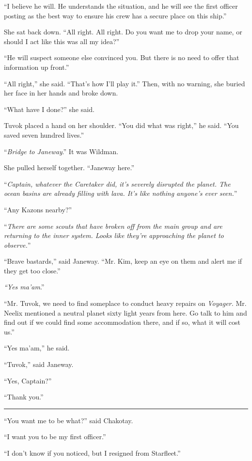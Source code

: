 \documentclass[twoside,letterpaper,12pt]{memoir}
\begin{document}
``I believe he will. He understands the situation, and he will see the first officer posting as the best way to ensure his crew has a secure place on this ship.'' 

She sat back down. ``All right. All right. Do you want me to drop your name, or should I act like this was all my idea?'' 

``He will suspect someone else convinced you. But there is no need to offer that information up front.''

``All right,'' she said. ``That's how I'll play it.'' Then, with no warning, she buried her face in her hands and broke down.

``What have I done?'' she said.

Tuvok placed a hand on her shoulder. ``You did what was right,'' he said. ``You saved seven hundred lives.''

``\textit{Bridge to Janeway}.'' It was Wildman. 

She pulled herself together. ``Janeway here.'' 

``\textit{Captain, whatever the Caretaker did, it’s severely disrupted the planet. The ocean basins are already filling with lava. It’s like nothing anyone’s ever seen.}'' 

``Any Kazons nearby?'' 

``\textit{There are some scouts that have broken off from the main group and are returning to the inner system. Looks like they’re approaching the planet to observe.}'' 

``Brave bastards,'' said Janeway. ``Mr. Kim, keep an eye on them and alert me if they get too close.'' 

\textit{``Yes ma’am}.'' 

``Mr. Tuvok, we need to find someplace to conduct heavy repairs on \textit{Voyager. }Mr. Neelix mentioned a neutral planet sixty light years from here. Go talk to him and find out if we could find some accommodation there, and if so, what it will cost us.'' 

``Yes ma’am,'' he said. 

``Tuvok,'' said Janeway.

``Yes, Captain?''

``Thank you.''

\fancybreak{\rule{3cm}{0.4 pt}} 

``You want me to be what?'' said Chakotay. 

``I want you to be my first officer.'' 

``I don’t know if you noticed, but I resigned from Starfleet.'' 
\end{document}
